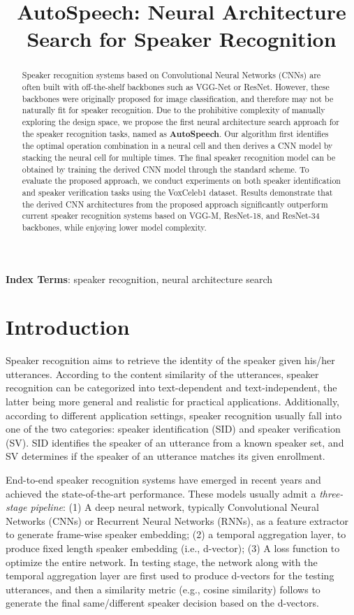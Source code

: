 \documentclass[a4paper]{article}
\title{AutoSpeech: Neural Architecture Search for Speaker Recognition}
\begin{document}
\maketitle
\begin{abstract}
Speaker recognition systems based on Convolutional Neural Networks (CNNs) are often built with off-the-shelf backbones such as VGG-Net or ResNet. However, these backbones were originally proposed for image classification, and therefore may not be naturally fit for speaker recognition. Due to the prohibitive complexity of manually exploring the design space, we propose the first neural architecture search approach for the speaker recognition tasks, named as \textbf{AutoSpeech}. Our algorithm first identifies the optimal operation combination in a neural cell and then derives a CNN model by stacking the neural cell for multiple times. The final speaker recognition model can be obtained by training the derived CNN model through the standard scheme. To evaluate the proposed approach, we conduct experiments on both speaker identification and speaker verification tasks using the VoxCeleb1 dataset. Results demonstrate that the derived CNN architectures from the proposed approach significantly outperform current speaker recognition systems based on VGG-M, ResNet-18, and ResNet-34 backbones, while enjoying lower model complexity.
\end{abstract}

\noindent\textbf{Index Terms}: speaker recognition, neural architecture search

\section{Introduction}
Speaker recognition aims to retrieve the identity of the speaker given his/her utterances. According to the content similarity of the utterances, speaker recognition can be categorized into text-dependent and text-independent, the latter being more general and realistic for practical applications. Additionally, according to different application settings, speaker recognition usually fall into one of the two categories: speaker identification (SID) and speaker verification (SV). SID identifies the speaker of an utterance from a known speaker set, and SV determines if the speaker of an utterance matches its given enrollment.

End-to-end speaker recognition systems \cite{variani2014deep, wan2018generalized, xie2019utterance, sadjadi2016ibm, li2017deep, snyder2018x} have emerged in recent years and achieved the state-of-the-art performance. These models usually admit a \textit{three-stage pipeline}: (1) A deep neural network, typically Convolutional Neural Networks (CNNs) or Recurrent Neural Networks (RNNs), as a feature extractor to generate frame-wise speaker embedding; (2) a temporal aggregation layer, to produce fixed length speaker embedding (i.e., d-vector); (3) A loss function to optimize the entire network. In testing stage, the network along with the temporal aggregation layer are first used to produce d-vectors for the testing utterances, and then a similarity metric (e.g., cosine similarity) follows to generate the final same/different speaker decision based on the d-vectors.
\end{document}
